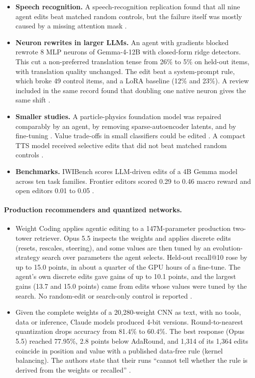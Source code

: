 \begin{itemize}[leftmargin=*,itemsep=2pt]
\item \textbf{Speech recognition.} A speech-recognition replication found that all nine agent edits beat matched random controls, but the failure itself was mostly caused by a missing attention mask \citep{zen23976684}.
\item \textbf{Neuron rewrites in larger LLMs.} An agent with gradients blocked rewrote 8 MLP neurons of Gemma-4-12B with closed-form ridge detectors. This cut a non-preferred translation tense from 26\% to 5\% on held-out items, with translation quality unchanged. The edit beat a system-prompt rule, which broke 49 control items, and a LoRA baseline (12\% and 23\%). A review included in the same record found that doubling one native neuron gives the same shift \citep{zen24156363}.
\item \textbf{Smaller studies.} A particle-physics foundation model was repaired comparably by an agent, by removing sparse-autoencoder latents, and by fine-tuning \citep{ax2611_27079}. Value trade-offs in small classifiers could be edited \citep{ax2611_24330}. A compact TTS model received selective edits that did not beat matched random controls \citep{ax2611_29455}.
\item \textbf{Benchmarks.} IWIBench scores LLM-driven edits of a 4B Gemma model across ten task families. Frontier editors scored 0.29 to 0.46 macro reward and open editors 0.01 to 0.05 \citep{ax2611_08647}.
\end{itemize}

\paragraph{Production recommenders and quantized networks.}
\begin{itemize}[leftmargin=*,itemsep=2pt]
\item Weight Coding applies agentic editing to a 147M-parameter production two-tower retriever. Opus 5.5 inspects the weights and applies discrete edits (resets, rescales, steering), and some values are then tuned by an evolution-strategy search over parameters the agent selects. Held-out recall@10 rose by up to 15.0 points, in about a quarter of the GPU hours of a fine-tune. The agent's own discrete edits gave gains of up to 10.1 points, and the largest gains (13.7 and 15.0 points) came from edits whose values were tuned by the search. No random-edit or search-only control is reported \citep{ax2611_29613}.
\item Given the complete weights of a 20{,}280-weight CNN as text, with no tools, data or inference, Claude models produced 4-bit versions. Round-to-nearest quantization drops accuracy from 81.4\% to 60.4\%. The best response (Opus 5.5) reached 77.95\%, 2.8 points below AdaRound, and 1{,}314 of its 1{,}364 edits coincide in position and value with a published data-free rule (kernel balancing). The authors state that their runs ``cannot tell whether the rule is derived from the weights or recalled'' \citep{ax2611_33031}.
\end{itemize}

